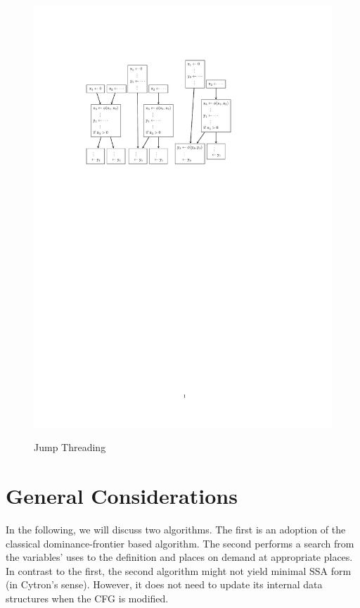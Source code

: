 \begin{figure}[htbp]
\begin{center}
{			\includegraphics{jump_thread_repair.pdf}
		}
	\end{center}
	\caption{Jump Threading}
	\label{fig:threading}
\end{figure}


\section{General Considerations}
In the following, we will discuss two algorithms.
The first is an adoption of the classical dominance-frontier based algorithm.
The second performs a search from the variables' uses to the definition and places \phifuns on demand at appropriate places. 
In contrast to the first, the second algorithm might not yield minimal SSA form (in Cytron's sense).
However, it does not need to update its internal data structures when the CFG is modified. 

